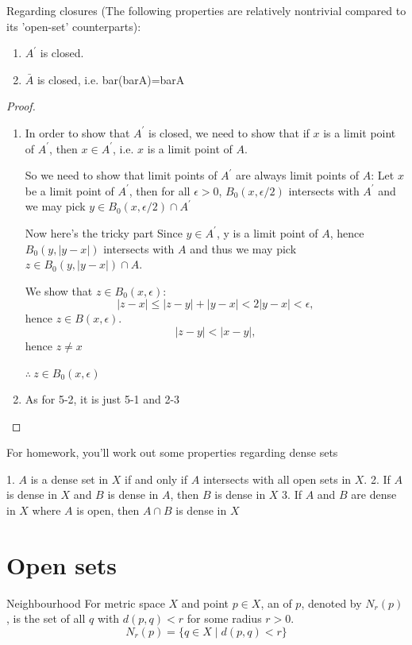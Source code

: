\begin{prbm}
Regarding closures (The following properties are relatively nontrivial compared to its 'open-set' counterparts):
\begin{enumerate}[label=(\alph*)]
\item $A^\prime$ is closed.
\item $\bar{A}$ is closed, i.e. bar(barA)=barA
\end{enumerate}
\end{prbm}

\begin{proof} \ {\\}
\begin{enumerate}[label=(\alph*)]
\item In order to show that $A^\prime$ is closed, we need to show that if $x$ is a limit point of $A^\prime$, then $x\in A^\prime$, i.e. $x$ is a limit point of $A$.

So we need to show that limit points of $A^\prime$ are always limit points of $A$: 
Let $x$ be a limit point of $A^\prime$, then for all $\epsilon>0$, $B_0(x,\epsilon/2)$ intersects with $A^\prime$ and we may pick $y \in B_0(x,\epsilon/2)\cap A^\prime$

Now here's the tricky part
Since $y \in A^\prime$, y is a limit point of $A$, hence $B_0(y,|y-x|)$ intersects with $A$ and thus we may pick $z \in B_0(y,|y-x|)\cap A$.

We show that $z \in B_0(x,\epsilon)$:
\[ |z-x|\le|z-y|+|y-x|<2|y-x|<\epsilon, \]
hence $z \in B(x,\epsilon)$.
\[ |z-y|<|x-y|, \]
hence $z \neq x$

$\therefore\:z \in B_0(x,\epsilon)$

\item As for 5-2, it is just 5-1 and 2-3
\end{enumerate}
\end{proof}

For homework, you'll work out some properties regarding dense sets

1. $A$ is a dense set in $X$ if and only if $A$ intersects with all open sets in $X$.
2. If $A$ is dense in $X$ and $B$ is dense in $A$, then $B$ is dense in $X$
3. If $A$ and $B$ are dense in $X$ where $A$ is open, then $A\cap B$ is dense in $X$
\pagebreak

\section{Open sets}
\begin{defn}{Neighbourhood}{}
For metric space $X$ and point $p \in X$, an  of $p$, denoted by $N_r(p)$, is the set of all $q$ with $d(p,q) < r$ for some radius $r > 0$.
\[ N_r(p) = \{q \in X \mid d(p,q) < r \} \]
\end{defn}

